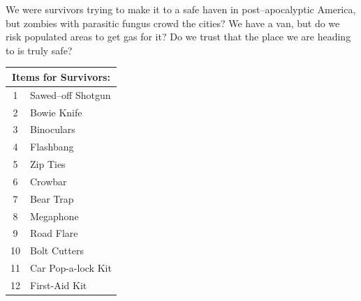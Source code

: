 \documentclass[landscape]{book}
\begin{document}
\begin{multicols*}{4}
We were survivors trying to make it to a safe haven in post--apocalyptic America, but zombies with parasitic fungus crowd the cities?
We have a van, but do we risk populated areas to get gas for it?
Do we trust that the place we are heading to is truly safe? 
\begin{center}
  \begin{tabular}[ht]{|c|p{}|}
    \hline \multicolumn{2}{|c|}{Items for Survivors:} \\
    \hline 1 & Sawed--off Shotgun \\
    2 & Bowie Knife \\
    3 & Binoculars \\
    4 & Flashbang \\
    5 & Zip Ties \\
    6 & Crowbar \\
    7 & Bear Trap \\
    8 & Megaphone \\
    9 & Road Flare \\
    10 & Bolt Cutters \\
    11 & Car Pop-a-lock Kit \\
    12 & First-Aid Kit \\ \hline
  \end{tabular}
\end{center}


\end{multicols*}
\end{document}

